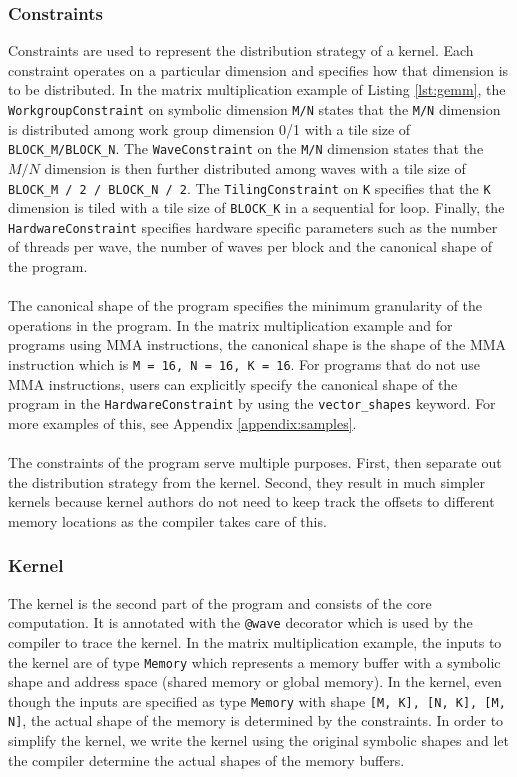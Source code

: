 \documentclass{article}
\begin{document}
\subsubsection{Constraints}
Constraints are used to represent the distribution strategy of a kernel. Each constraint operates on a particular
dimension and specifies how that dimension is to be distributed. In the matrix multiplication example of Listing \ref{lst:gemm},
the \texttt{WorkgroupConstraint} on symbolic dimension \texttt{M/N} states that the \texttt{M/N} dimension is distributed among work group dimension 0/1
with a tile size of \texttt{BLOCK\_M/BLOCK\_N}. The \texttt{WaveConstraint} on the \texttt{M/N} dimension states that the $M/N$ dimension is then further distributed among waves
with a tile size of \texttt{BLOCK\_M / 2 / BLOCK\_N / 2}. The \texttt{TilingConstraint} on \texttt{K} specifies that the \texttt{K} dimension is tiled with a tile size of \texttt{BLOCK\_K}
in a sequential for loop. Finally, the \texttt{HardwareConstraint} specifies hardware specific parameters such as the number of threads per wave, the number of waves per block and
the canonical shape of the program.
\\ \\
The canonical shape of the program specifies the minimum granularity of the operations in the program. In the matrix multiplication example and for programs using MMA instructions, the canonical shape is
the shape of the MMA instruction which is \texttt{M = 16, N = 16, K = 16}. For programs that do not use MMA instructions, users can
explicitly specify the canonical shape of the program in the \texttt{HardwareConstraint} by using the \texttt{vector\_shapes} keyword. For more examples of this,
see Appendix \ref{appendix:samples}.
\\ \\
The constraints of the program serve multiple purposes. First, then separate out the distribution strategy from the kernel.
Second, they result in much simpler kernels because kernel authors do not need to keep track the offsets to different memory locations
as the compiler takes care of this.

\subsubsection{Kernel}
The kernel is the second part of the program and consists of the core computation. It is annotated with the \texttt{@wave} decorator which
is used by the compiler to trace the kernel. In the matrix multiplication example, the inputs to the kernel are of type \texttt{Memory} which
represents a memory buffer with a symbolic shape and address space (shared memory or global memory). In the kernel,
even though the inputs are specified as type \texttt{Memory} with shape \texttt{[M, K], [N, K], [M, N]}, the actual shape of the memory
is determined by the constraints. In order to simplify the kernel, we write the kernel using the original symbolic shapes and let the compiler
determine the actual shapes of the memory buffers.
\end{document}
